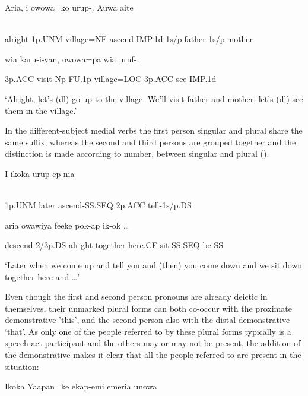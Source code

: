 \ea%
\label{ex:x1262}
\gll Aria,  i  owowa=ko  urup-.  Auwa  aite \\
      \\
\glt
\z

alright  1p.UNM  village=NF  ascend-IMP.1d  1s/p.father  1s/p.mother

wia  karu-i-yan,  owowa=pa  wia  uruf-.

3p.ACC  visit-Np-FU.1p  village=LOC  3p.ACC  see-IMP.1d

`Alright, let's (dl) go up to the village. We'll visit father and mother, let's (dl) see them in the village.'

In the different-subject medial verbs the first person singular and plural share the same suffix, whereas the second and third persons are grouped together and the distinction is made according to number, between singular and plural ().

\ea%
\label{ex:x1263}
\gll I  ikoka  urup-ep  nia   \\
      \\
\glt
\z

1p.UNM  later  ascend-SS.SEQ  2p.ACC  tell-1s/p.DS

  aria  owawiya  feeke  pok-ap  ik-ok  {\dots}

descend-2/3p.DS  alright  together  here.CF  sit-SS.SEQ  be-SS

`Later when we come up and tell you and (then) you come down and we sit down together here and {\dots}'

Even though the first and second person pronouns are already deictic in themselves, their unmarked plural forms can both co-occur with the proximate demonstrative  'this', and the second person also with the distal demonstrative  `that'. As only one of the people referred to by these plural forms typically is a speech act participant and the others may or may not be present, the addition of the demonstrative  makes it clear that all the people referred to are present in the situation: 

\ea%
\label{ex:x1269}
\gll Ikoka  Yaapan=ke  ekap-emi    emeria  unowa   \\
      \\
\glt
\z

